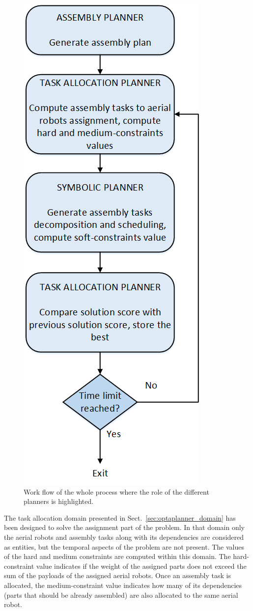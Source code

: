 \documentclass[letterpaper, 10 pt, conference]{ieeeconf}  %
\begin{document}
    \begin{figure}
    \centering
    \includegraphics[width=0.40\columnwidth]{planning_algorithm.png}
    \caption[Planning algorithm.]{Work flow of the whole process where the role of the different planners is highlighted. }
    \label{fig:planning_algorithm}
\end{figure}


The task allocation domain presented in Sect.~\ref{sec:optaplanner_domain} has been designed to solve the assignment part of the problem. In that domain only the aerial robots and assembly tasks along with its dependencies are considered as entities, but the temporal aspects of the problem are not present. The values of the hard and medium constraints are computed within this domain. The hard-constraint value indicates if the weight of the assigned parts does not exceed the sum of the payloads of the assigned aerial robots. Once an assembly task is allocated, the medium-constraint value indicates how many of its dependencies (parts that should be already assembled) are also allocated to the same aerial robot.
\end{document}
